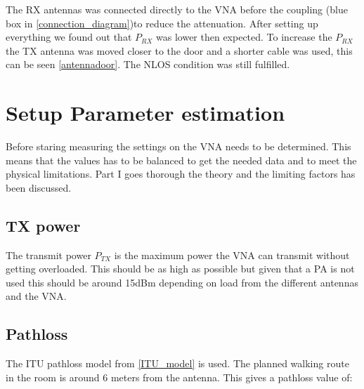 The RX antennas was connected directly to the VNA before the coupling (blue box in \autoref{connection_diagram})to reduce the attenuation. After setting up everything we found out that $P_{RX}$ was lower then expected. To increase the $P_{RX}$ the TX antenna was moved closer to the door and a shorter cable was used, this can be seen \autoref{antennadoor}. The NLOS condition was still fulfilled. 

%
%


\chapter{Setup Parameter estimation}\label{sec:setup_parameter}
Before staring measuring the settings on the VNA needs to be determined. This means that the values has to be  balanced to get the needed data and to meet the physical limitations. Part I goes thorough the theory and the limiting factors has been discussed.



\section{TX power}
The transmit power $P_{TX}$ is the maximum power the VNA can transmit without getting overloaded. This should be as high as possible but given that a \gls{PA} is not used this should be around 15dBm \citep{Key_PNA} depending on load from the different antennas and the VNA.
\section{Pathloss}
The ITU pathloss model from \autoref{ITU_model} is used. The planned walking route in the room is around 6 meters from the antenna. This gives a pathloss value of:


